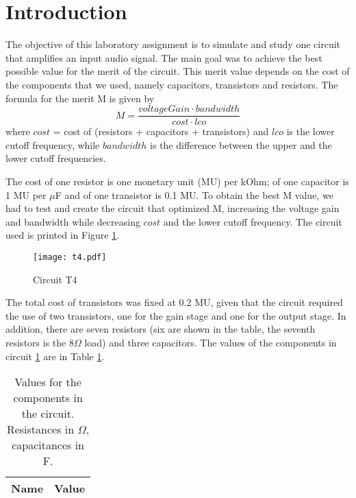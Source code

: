 \section{Introduction}
\label{sec:introduction}

The objective of this laboratory assignment is to simulate and study one circuit that amplifies an input audio signal. The main goal was to achieve the best possible value for the merit of the circuit. This merit value depends on the cost of the components that we used, namely capacitors, transistors and resistors. The formula for the merit M is given by 
\begin{equation}
   M= \frac{voltageGain \cdot bandwidth}{cost \cdot lco}
\end{equation}
where $cost$ = cost of (resistors + capacitors + transistors) and $lco$ is the lower cutoff frequency, while $bandwidth$ is the difference between the upper and the lower cutoff frequencies.

The cost of one resistor is one monetary unit (MU) per kOhm; of one capacitor is 1 MU per $\mu$F and of one transistor is 0.1 MU. To obtain the best M value, we had to test and create the circuit that optimized M, increasing the voltage gain and bandwidth while decreasing $cost$ and the lower cutoff frequency. The circuit used is printed in Figure \ref{circuit}.

\begin{figure}[H] \centering
\texttt{[image: t4.pdf]} %
\caption{Circuit T4}
\label{circuit}
\end{figure}

The total cost of transistors was fixed at 0.2 MU, given that the circuit required the use of two transistors, one for the gain stage and one for the output stage. In addition, there are seven resistors (six are shown in the table, the seventh resistors is the 8$\Omega$ load) and three capacitors. The values of the components in circuit \ref{circuit} are in Table \ref{tab_valores}.
\begin{table}[H]
\centering
    \begin{tabular}{c|c}        %
\hline                      %

\textbf{Name}  & \textbf{Value}\\     
\hline                      %

\hline                      %
\end{tabular}
    \caption{Values for the components in the circuit. Resistances in $\Omega$, capacitances in F.}
 \label{tab_valores}
\end{table}               
\FloatBarrier

 
